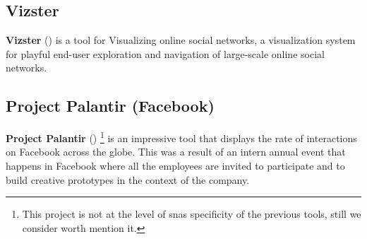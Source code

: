 \subsection{Vizster}

\textbf{Vizster} (\cite{heer2005vizster}) is a tool for Visualizing online social networks, a visualization system for playful end-user exploration and navigation of large-scale online social networks.

\subsection{Project Palantir (Facebook)}

\textbf{Project Palantir} (\cite{project-palantir}) \footnote{This project is not at the level of \glspl{sna} specificity of the previous tools, still we consider worth mention it.} is an impressive tool that displays the rate of interactions on Facebook across the globe. This was a result of an intern annual event that happens in Facebook where all the employees are invited to participate and to build creative prototypes in the context of the company.
